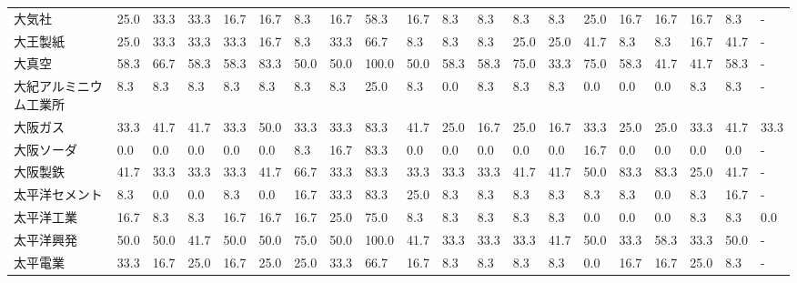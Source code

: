 \begin{tabular}{llllllllllllllllllll}
大気社             &   25.0 &   33.3 &      33.3 &      16.7 &       16.7 &    8.3 &   16.7 &   58.3 &    16.7 &     8.3 &    8.3 &   8.3 &    8.3 &    25.0 &    16.7 &  16.7 &  16.7 &   8.3 &     - \\
大王製紙            &   25.0 &   33.3 &      33.3 &      33.3 &       16.7 &    8.3 &   33.3 &   66.7 &     8.3 &     8.3 &    8.3 &  25.0 &   25.0 &    41.7 &     8.3 &   8.3 &  16.7 &  41.7 &     - \\
大真空             &   58.3 &   66.7 &      58.3 &      58.3 &       83.3 &   50.0 &   50.0 &  100.0 &    50.0 &    58.3 &   58.3 &  75.0 &   33.3 &    75.0 &    58.3 &  41.7 &  41.7 &  58.3 &     - \\
大紀アルミニウム工業所     &    8.3 &    8.3 &       8.3 &       8.3 &        8.3 &    8.3 &    8.3 &   25.0 &     8.3 &     0.0 &    8.3 &   8.3 &    8.3 &     0.0 &     0.0 &   0.0 &   8.3 &   8.3 &     - \\
大阪ガス            &   33.3 &   41.7 &      41.7 &      33.3 &       50.0 &   33.3 &   33.3 &   83.3 &    41.7 &    25.0 &   16.7 &  25.0 &   16.7 &    33.3 &    25.0 &  25.0 &  33.3 &  41.7 &  33.3 \\
大阪ソーダ           &    0.0 &    0.0 &       0.0 &       0.0 &        0.0 &    8.3 &   16.7 &   83.3 &     0.0 &     0.0 &    0.0 &   0.0 &    0.0 &    16.7 &     0.0 &   0.0 &   0.0 &   0.0 &     - \\
大阪製鉄            &   41.7 &   33.3 &      33.3 &      33.3 &       41.7 &   66.7 &   33.3 &   83.3 &    33.3 &    33.3 &   33.3 &  41.7 &   41.7 &    50.0 &    83.3 &  83.3 &  25.0 &  41.7 &     - \\
太平洋セメント         &    8.3 &    0.0 &       0.0 &       8.3 &        0.0 &   16.7 &   33.3 &   83.3 &    25.0 &     8.3 &    8.3 &   8.3 &    8.3 &     8.3 &     8.3 &   0.0 &   8.3 &  16.7 &     - \\
太平洋工業           &   16.7 &    8.3 &       8.3 &      16.7 &       16.7 &   16.7 &   25.0 &   75.0 &     8.3 &     8.3 &    8.3 &   8.3 &    8.3 &     0.0 &     0.0 &   0.0 &   8.3 &   8.3 &   0.0 \\
太平洋興発           &   50.0 &   50.0 &      41.7 &      50.0 &       50.0 &   75.0 &   50.0 &  100.0 &    41.7 &    33.3 &   33.3 &  33.3 &   41.7 &    50.0 &    33.3 &  58.3 &  33.3 &  50.0 &     - \\
太平電業            &   33.3 &   16.7 &      25.0 &      16.7 &       25.0 &   25.0 &   33.3 &   66.7 &    16.7 &     8.3 &    8.3 &   8.3 &    8.3 &     0.0 &    16.7 &  16.7 &  25.0 &   8.3 &     - \\

\end{tabular}
